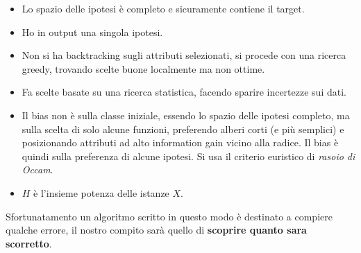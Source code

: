 \begin{itemize}
  \item Lo spazio delle ipotesi è completo e sicuramente contiene il target.
  \item Ho in output una singola ipotesi.
  \item Non si ha backtracking sugli attributi selezionati, si procede con una
  ricerca greedy, trovando scelte buone localmente ma non ottime.
  \item Fa scelte basate su una ricerca statistica, facendo sparire incertezze
  sui dati.
  \item Il bias non è sulla classe iniziale, essendo lo spazio delle ipotesi
  completo, ma sulla scelta di solo alcune funzioni, preferendo alberi corti (e
  più semplici) e posizionando attributi ad alto information gain vicino alla
  radice. Il bias è quindi sulla preferenza di alcune ipotesi. Si usa il
  criterio euristico di \textit{rasoio di Occam}.
  \item $H$ è l'insieme potenza delle istanze $X$.
\end{itemize}
Sfortunatamento un algoritmo scritto in questo modo è destinato a compiere qualche errore, il nostro compito sarà quello di \textbf{scoprire quanto sara scorretto}.
